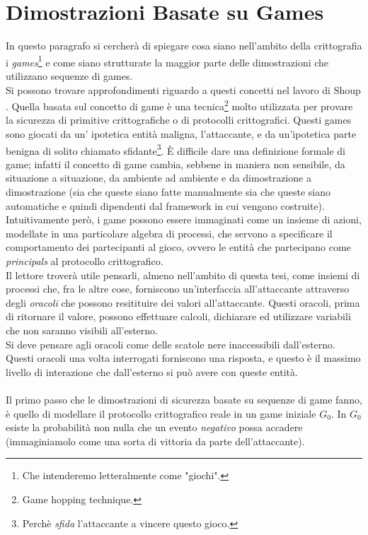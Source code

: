 \documentclass[a4paper,openright,twoside,12pt]{report}
\begin{document}
\section{Dimostrazioni Basate su Games}
In questo paragrafo si cercher\`a di spiegare cosa siano nell'ambito della crittografia i \emph{games}\footnote{Che intenderemo letteralmente come "giochi".} e come siano strutturate la
maggior parte delle dimostrazioni che utilizzano sequenze di games.\\Si possono trovare approfondimenti riguardo a questi concetti nel lavoro di Shoup \cite{shoup}.
Quella basata sul concetto di game \`e una tecnica\footnote{Game hopping technique.} molto utilizzata per provare la sicurezza di primitive crittografiche o di protocolli crittografici.
Questi games sono giocati da un' ipotetica entit\`a maligna, l'attaccante, e da un'ipotetica parte benigna di solito chiamato sfidante\footnote{Perch\`e \emph{sfida} l'attaccante a 
vincere questo gioco.}. 
\`E difficile dare una definizione formale di game; infatti il concetto di game cambia, sebbene in maniera non sensibile, da situazione a situazione, da ambiente ad ambiente e 
da dimostrazione a dimostrazione (sia che queste siano fatte manualmente sia che queste siano automatiche e quindi dipendenti dal framework in cui vengono costruite).
Intuitivamente per\`o, i game possono essere immaginati come un insieme di azioni, modellate in una particolare algebra di processi, 
che servono a specificare il comportamento dei partecipanti al gioco, ovvero le entit\`a che partecipano come \emph{principals} al protocollo crittografico.\\
Il lettore trover\`a utile pensarli, almeno nell'ambito di questa tesi, come insiemi di processi che, fra le altre cose, forniscono un'interfaccia all'attaccante attraverso degli 
\emph{oracoli} che possono resitituire dei valori all'attaccante. Questi oracoli, prima di ritornare il valore, possono effettuare calcoli, dichiarare ed utilizzare variabili che non saranno
visibili all'esterno.\\Si deve pensare agli oracoli come delle scatole nere inaccessibili dall'esterno. Questi oracoli una volta interrogati forniscono una risposta,
e questo \`e il massimo livello di interazione che dall'esterno si pu\`o avere con queste entit\`a.\\ \\
Il primo passo che le dimostrazioni di sicurezza basate su sequenze di game fanno, \`e quello di modellare il protocollo crittografico reale in un game iniziale $G_0$.
In $G_0$ esiste la probabilit\`a non nulla che un evento \emph{negativo} possa accadere (immaginiamolo come una sorta di vittoria da parte dell'attaccante).
\end{document}
